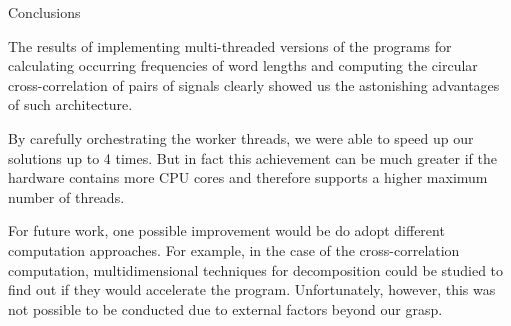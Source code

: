 \documentclass{beamer}
\begin{document}


\begin{frame}{Conclusions}
	
	The results of implementing multi-threaded versions of the programs for calculating occurring frequencies of word lengths and computing the circular 
	cross-correlation of pairs of signals clearly showed us the astonishing advantages of such architecture.

	By carefully orchestrating the worker threads, we were able to speed up our solutions up to 4 times.
	But in fact this achievement can be much greater if the hardware contains more CPU cores and therefore supports a higher maximum number of threads.

	For future work, one possible improvement would be do adopt different computation approaches.
	For example, in the case of the cross-correlation computation, multidimensional techniques for decomposition could be studied to find out if they would 
	accelerate the program.
	Unfortunately, however, this was not possible to be conducted due to external factors beyond our grasp.

\end{frame}
\end{document}
